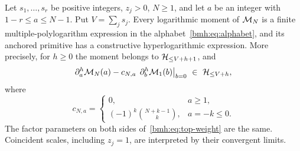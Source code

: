 \begin{theorem}
\label{bmh:thm:closure}
Let $s_1,\ldots,s_r$ be positive integers, $z_j>0$, $N\ge1$, and let
$a$ be an integer with $1-r\le a\le N-1$. Put $V=\sum_j s_j$.
Every logarithmic moment of $\mathcal M_N$ is a finite multiple-polylogarithm
expression in the alphabet~\eqref{bmh:eq:alphabet}, and its anchored
primitive has a constructive hyperlogarithmic expression. More precisely,
for $h\ge0$ the moment belongs to $\mathcal H_{\le V+h+1}$, and
\begin{equation}\label{bmh:eq:top-weight}
 \partial_a^h\mathcal M_N(a)-c_{N,a}\,
 \left.\partial_b^h\mathcal M_1(b)\right|_{b=0}
 \ \in\ \mathcal H_{\le V+h},
\end{equation}
where
\begin{equation}\label{bmh:eq:residue}
 c_{N,a}=\begin{cases}
 0,&a\ge1,\\
 (-1)^k\binom{N+k-1}{k},&a=-k\le0.
 \end{cases}
\end{equation}
The factor parameters on both sides of~\eqref{bmh:eq:top-weight} are the
same. Coincident scales, including $z_j=1$, are interpreted by their
convergent limits.
\end{theorem}
